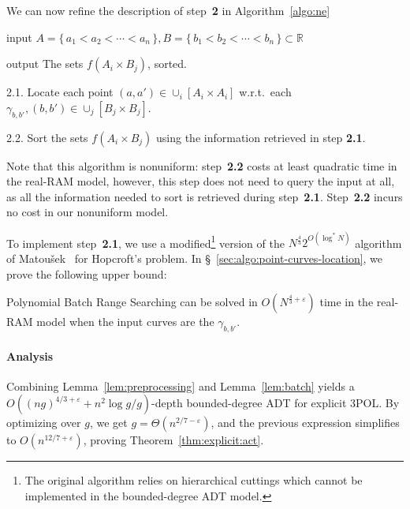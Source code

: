 We can now refine the description of step~\textbf{2} in Algorithm~\ref{algo:ne}
\begin{algorithm}\label{algo:sfaixbj}
\item[input] $A = \{\,a_1<a_2<\cdots<a_n\,\},B = \{\,b_1<b_2<\cdots<b_n\,\}
    \subset \mathbb{R}$
\item[output] The sets $f(A_i \times B_j)$, sorted.
\item[2.1.] Locate each point $(a,a') \in \cup_i [A_i \times A_i]$ w.r.t.\
    each $\gamma_{b,b'}, (b,b') \in \cup_j [B_j \times B_j]$.
\item[2.2.] Sort the sets $f(A_i \times B_j)$ using the
    information retrieved in step \textbf{2.1}.
\end{algorithm}
Note that this algorithm is nonuniform: step~\textbf{2.2} costs at least
quadratic time in the real-RAM model, however, this step does not need to
query the input at all, as all the information needed to sort is retrieved during
step~\textbf{2.1}.
Step~\textbf{2.2} incurs no cost in
our nonuniform model.

To implement step~\textbf{2.1}, we use a modified\footnote{The original
algorithm relies on hierarchical cuttings which cannot be
implemented in the bounded-degree ADT model.}
version of the $N^{\frac{4}{3}} 2^{O(\log^* N)}$ algorithm of
Matou\v{s}ek~\cite{Ma93} for Hopcroft's problem.
In \S~\ref{sec:algo:point-curves-location}, we prove the following upper bound:
\begin{lemma}\label{lem:batch}
Polynomial Batch Range Searching can be solved in
$O(N^{\frac{4}{3}+\varepsilon})$ time in the real-RAM model when the input
curves are the $\gamma_{b,b'}$.
\end{lemma}


\paragraph{Analysis}
Combining Lemma~\ref{lem:preprocessing} and Lemma~\ref{lem:batch} yields a $O(
{(ng)}^{4/3+\varepsilon} + n^2 \log g / g)$-depth bounded-degree ADT for
explicit 3POL\@. By optimizing over $g$, we get $g = \Theta(n^{2/7-\varepsilon})$, and
the previous expression simplifies to $O(n^{12/7+\varepsilon})$, proving
Theorem~\ref{thm:explicit:act}.
